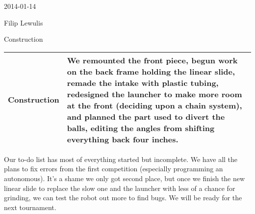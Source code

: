 2014-01-14

Filip Lewulis

Construction

\begin{tabular}{|p{5cm}|p{5cm}|}
\hline Construction &
We remounted the front piece, begun work on the back frame holding the linear slide,  remade the intake with plastic tubing, redesigned the launcher to make more room at the front (deciding upon a chain system), and planned the part used to divert the balls, editing the angles from shifting everything back four inches.\\
\hline
\end{tabular}
Our to-do list has most of everything started but incomplete. We have all the plans to fix errors from the first competition (especially programming an autonomous). It's a shame we only got second place, but once we finish the new linear slide to replace the slow one and the launcher with less of a chance for grinding, we can test the robot out more to find bugs. We will be ready for the next tournament.
